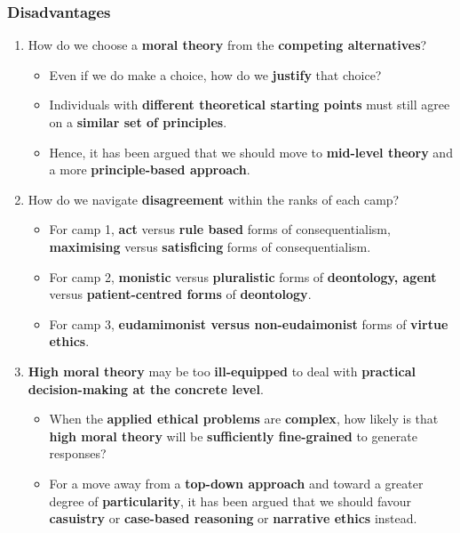 \documentclass[11pt]{article}
\begin{document}
\subsubsection{Disadvantages}
\label{sec:orgdbfe4b5}
\begin{enumerate}
\item How do we choose a \textbf{moral theory} from the \textbf{competing alternatives}?
\begin{itemize}
\item Even if we do make a choice, how do we \textbf{justify} that choice?
\item Individuals with \textbf{different theoretical starting points} must still agree on a \textbf{similar set of principles}.
\item Hence, it has been argued that we should move to \textbf{mid-level theory} and a more \textbf{principle-based approach}.
\end{itemize}
\item How do we navigate \textbf{disagreement} within the ranks of each camp?
\begin{itemize}
\item For camp 1, \textbf{act} versus \textbf{rule based} forms of consequentialism, \textbf{maximising} versus \textbf{satisficing} forms of consequentialism.
\item For camp 2, \textbf{monistic} versus \textbf{pluralistic} forms of \textbf{deontology, agent} versus \textbf{patient-centred forms} of \textbf{deontology}.
\item For camp 3, \textbf{eudamimonist versus non-eudaimonist} forms of \textbf{virtue ethics}.
\end{itemize}
\item \textbf{High moral theory} may be too \textbf{ill-equipped} to deal with \textbf{practical decision-making at the concrete level}.
\begin{itemize}
\item When the \textbf{applied ethical problems} are \textbf{complex}, how likely is that \textbf{high moral theory} will be \textbf{sufficiently fine-grained} to generate responses?
\item For a move away from a \textbf{top-down approach} and toward a greater degree of \textbf{particularity}, it has been argued that we should favour \textbf{casuistry} or \textbf{case-based reasoning} or \textbf{narrative ethics} instead.
\end{itemize}
\end{enumerate}
\end{document}
